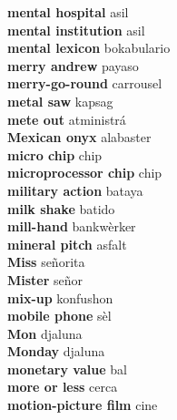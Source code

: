 \textbf{ mental hospital  } asil \\
\textbf{ mental institution  } asil \\
\textbf{ mental lexicon  } bokabulario \\
\textbf{ merry andrew  } payaso \\
\textbf{ merry-go-round  } carrousel \\
\textbf{ metal saw  } kapsag \\
\textbf{ mete out  } atministrá \\
\textbf{ Mexican onyx  } alabaster \\
\textbf{ micro chip  } chip \\
\textbf{ microprocessor chip  } chip \\
\textbf{ military action  } bataya \\
\textbf{ milk shake  } batido \\
\textbf{ mill-hand  } bankwèrker \\
\textbf{ mineral pitch  } asfalt \\
\textbf{ Miss  } señorita \\
\textbf{ Mister  } señor \\
\textbf{ mix-up  } konfushon \\
\textbf{ mobile phone  } sèl \\
\textbf{ Mon  } djaluna \\
\textbf{ Monday  } djaluna \\
\textbf{ monetary value  } bal \\
\textbf{ more or less  } cerca \\
\textbf{ motion-picture film  } cine \\
